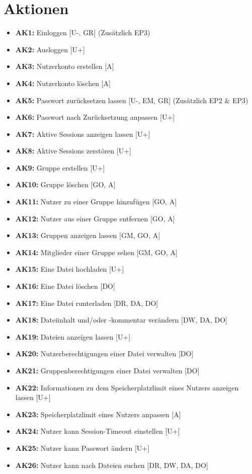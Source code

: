 \documentclass[fontsize=12pt,DIV=14,BCOR=10mm,a4paper,parskip=half-,headsepline,headinclude,english,ngerman,bibliography=totocnumbered]{scrreprt}
\begin{document}
\chapter{Aktionen}

\begin{itemize}
  \item \textbf{AK1:} Einloggen [U-, GR] (Zusätzlich EP3)
  \item \textbf{AK2:} Ausloggen [U+]
  \item \textbf{AK3:} Nutzerkonto erstellen [A]
  \item \textbf{AK4:} Nutzerkonto löschen [A]
  \item \textbf{AK5:} Passwort zurücksetzen lassen [U-, EM, GR] (Zusätzlich EP2 \& EP3)
  \item \textbf{AK6:} Passwort nach Zurücksetzung anpassen [U+]
  \item \textbf{AK7:} Aktive Sessions anzeigen lassen [U+]
  \item \textbf{AK8:} Aktive Sessions zerstören [U+]
  \item \textbf{AK9:} Gruppe erstellen [U+]
  \item \textbf{AK10:} Gruppe löschen [GO, A]
  \item \textbf{AK11:} Nutzer zu einer Gruppe hinzufügen [GO, A]
  \item \textbf{AK12:} Nutzer aus einer Gruppe entfernen [GO, A]
  \item \textbf{AK13:} Gruppen anzeigen lassen [GM, GO, A]
  \item \textbf{AK14:} Mitglieder einer Gruppe sehen [GM, GO, A]
  \item \textbf{AK15:} Eine Datei hochladen [U+]
  \item \textbf{AK16:} Eine Datei löschen [DO]
  \item \textbf{AK17:} Eine Datei runterladen [DR, DA, DO]
  \item \textbf{AK18:} Dateiinhalt und/oder -kommentar verändern [DW, DA, DO]
  \item \textbf{AK19:} Dateien anzeigen lassen [U+]
  \item \textbf{AK20:} Nutzerberechtigungen einer Datei verwalten [DO]
  \item \textbf{AK21:} Gruppenberechtigungen einer Datei verwalten [DO]
  \item \textbf{AK22:} Informationen zu dem Speicherplatzlimit eines Nutzers anzeigen lassen [U+]
  \item \textbf{AK23:} Speicherplatzlimit eines Nutzers anpassen [A]
  \item \textbf{AK24:} Nutzer kann Session-Timeout einstellen [U+]
  \item \textbf{AK25:} Nutzer kann Passwort ändern [U+]
  \item \textbf{AK26:} Nutzer kann nach Dateien suchen [DR, DW, DA, DO]
\end{itemize}
\end{document}
